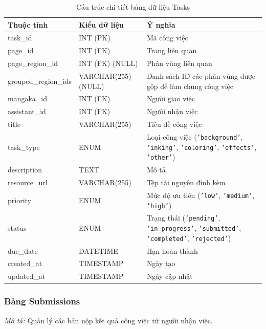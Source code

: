 \noindent
\begin{table}[H]
\centering
\renewcommand{\arraystretch}{1.3}
\begin{tabularx}{\textwidth}{|p{4cm}|p{3cm}|>{\raggedright\arraybackslash}X|}
\hline
\rowcolor{tableheader}
\textbf{Thuộc tính} & \textbf{Kiểu dữ liệu} & \textbf{Ý nghĩa} \\ \hline
task\_id & INT (PK) & Mã công việc \\ \hline
page\_id & INT (FK) & Trang liên quan \\ \hline
page\_region\_id & INT (FK) (NULL) & Phân vùng liên quan \\ \hline
grouped\_region\_ids & VARCHAR(255) (NULL) & Danh sách ID các phân vùng được gộp để làm chung công việc \\ \hline
mangaka\_id & INT (FK) & Người giao việc \\ \hline
assistant\_id & INT (FK) & Người nhận việc \\ \hline
title & VARCHAR(255) & Tiêu đề công việc \\ \hline
task\_type & ENUM & Loại công việc (\texttt{'background'}, \texttt{'inking'}, \texttt{'coloring'}, \texttt{'effects'}, \texttt{'other'}) \\ \hline
description & TEXT & Mô tả \\ \hline
resource\_url & VARCHAR(255) & Tệp tài nguyên đính kèm \\ \hline
priority & ENUM & Mức độ ưu tiên (\texttt{'low'}, \texttt{'medium'}, \texttt{'high'}) \\ \hline
status & ENUM & Trạng thái (\texttt{'pending'}, \texttt{'in\_progress'}, \texttt{'submitted'}, \texttt{'completed'}, \texttt{'rejected'}) \\ \hline
due\_date & DATETIME & Hạn hoàn thành \\ \hline
created\_at & TIMESTAMP & Ngày tạo \\ \hline
updated\_at & TIMESTAMP & Ngày cập nhật \\ \hline
\end{tabularx}
\caption{Cấu trúc chi tiết bảng dữ liệu Tasks}
\label{tab:db_tasks}
\end{table}
\vspace{0.5cm}

\subsubsection{Bảng Submissions}
\label{subsubsec:tbl_submissions}
\textit{Mô tả:} Quản lý các bản nộp kết quả công việc từ người nhận việc.

